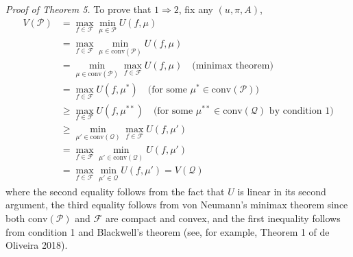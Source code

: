\documentclass[12pt,a4paper]{article}
\newenvironment{original}
  {\par\vspace{4pt}\noindent\color{black}\ignorespaces}
  {\par\vspace{2pt}}
\newcommand{\calF}{\mathcal{F}}
\newcommand{\conv}{\mathrm{conv}}
\begin{document}
\begin{original}
\textit{Proof of Theorem 5.} To prove that $1\Rightarrow 2$, fix any $(u,\pi,A)$,
\begin{align}
    V(\mathcal{P}) &= \max_{f\in\calF} \min_{\mu\in\mathcal{P}} U(f, \mu) \nonumber\\
                   &= \max_{f\in\calF} \min_{\mu\in\conv(\mathcal{P})} U(f, \mu) \nonumber\\
                   &= \min_{\mu\in\conv(\mathcal{P})} \max_{f\in\calF} U(f, \mu) \quad\text{(minimax theorem)}\nonumber\\
                   &= \max_{f\in\calF} U(f, \mu^*) \quad\text{(for some }\mu^*\in\conv(\mathcal{P})\text{)} \nonumber\\
                   &\geq \max_{f\in\calF} U(f, \mu^{**}) \quad\text{(for some }\mu^{**}\in\conv(\mathcal{Q})\text{ by condition 1)}\nonumber\\
                   &\geq \min_{\mu'\in\conv(\mathcal{Q})} \max_{f\in\calF} U(f, \mu') \nonumber\\
                   &= \max_{f\in\calF} \min_{\mu'\in\conv(\mathcal{Q})} U(f, \mu') \nonumber\\
                   &= \max_{f\in\calF} \min_{\mu'\in\mathcal{Q}} U(f, \mu') = V(\mathcal{Q})
\end{align}
where the second equality follows from the fact that $U$ is linear in its second argument, the third equality follows from von Neumann's minimax theorem since both $\conv(\mathcal{P})$ and $\calF$ are compact and convex, and the first inequality follows from condition 1 and Blackwell's theorem (see, for example, Theorem 1 of de Oliveira 2018).
\end{original}
\end{document}
